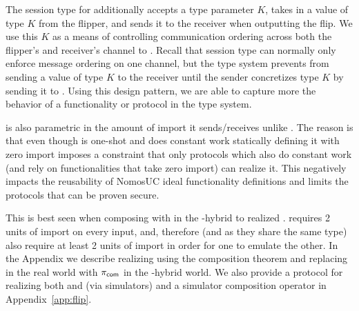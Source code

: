 The session type for \Fflip additionally accepts a type parameter $K$, takes in a value of type $K$ from the flipper, and sends it to the receiver when outputting the flip.
We use this $K$ as a means of controlling communication ordering across both the flipper's and receiver's channel to \Fflip.
Recall that session type can normally only enforce message ordering on one channel, but the type system prevents \Fflip from sending a value of type $K$ to the receiver until the sender concretizes type $K$ by sending it to \Fflip.
Using this design pattern, we are able to capture more the behavior of a functionality or protocol in the type system.

\Fflip is also parametric in the amount of import it sends/receives unlike \Fropp. The reason is that even though \Fflip is one-shot and does constant work
statically defining it with zero import imposes a constraint that only protocols which also do constant work (and rely on functionalities that take zero import) 
can realize it. 
This negatively impacts the reusability of NomosUC ideal functionality definitions and limits the protocols that can be proven secure.

This is best seen when composing  with  in the \Fropp-hybrid to realized \Fflip. \Fropp requires 2 units of import on every input, and, therefore  (and \Fflip as they share the same type) also require at least 2 units of import in order for one to emulate the other.
In the Appendix we describe realizing \Fflip using the composition theorem and replacing \Fcom in the real world with $\pi_{{\mathsf {com}}}$ in the \Fropp-hybrid world.
We also provide a protocol for realizing both \Fflip and \Fcom (via simulators) and a simulator composition operator in Appendix~\ref{app:flip}.


